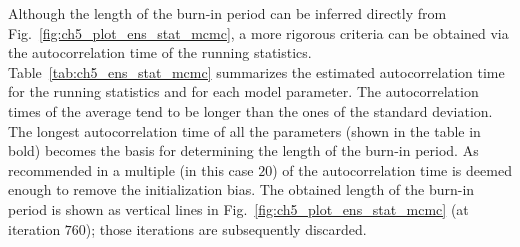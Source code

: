 Although the length of the burn-in period can be inferred directly from Fig.~\ref{fig:ch5_plot_ens_stat_mcmc}, a more rigorous criteria can be obtained via the autocorrelation time of the running statistics.
Table~\ref{tab:ch5_ens_stat_mcmc} summarizes the estimated autocorrelation time for the running statistics and for each model parameter.
The autocorrelation times of the average tend to be longer than the ones of the standard deviation. 
The longest autocorrelation time of all the parameters (shown in the table in bold) becomes the basis for determining the length of the burn-in period.
As recommended in \cite{Sokal1997} a multiple (in this case $20$) of the autocorrelation time is deemed enough to remove the initialization bias.
The obtained length of the burn-in period is shown as vertical lines in Fig.~\ref{fig:ch5_plot_ens_stat_mcmc} (at iteration $760$); those iterations are subsequently discarded.
